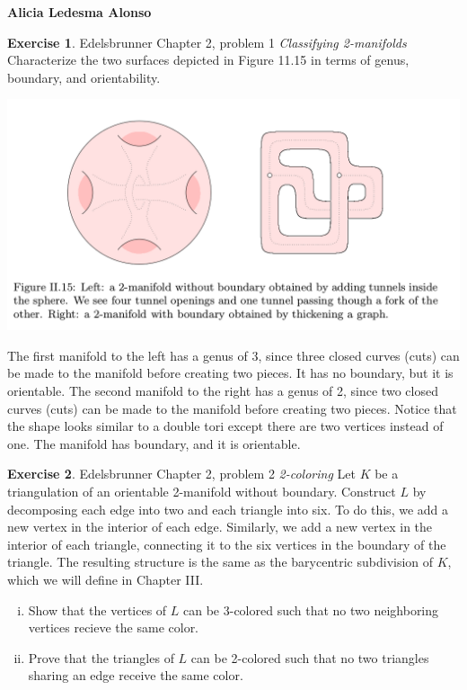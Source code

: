 \documentclass[12pt]{article}
\theoremstyle{definition}
\newtheorem{exercise}{Exercise}
\begin{document}
\textbf{Alicia Ledesma Alonso}

\begin{exercise} Edelsbrunner Chapter 2, problem 1 \textit{Classifying 2-manifolds}\newline
	Characterize the two surfaces depicted in Figure 11.15 in terms of genus, boundary, and orientability. \begin{center}\includegraphics[scale=0.4]{FigureII-15}\end{center} The first manifold to the left has a genus of 3, since three closed curves (cuts) can be made to the manifold before creating two pieces. It has no boundary, but it is orientable. The second manifold to the right has a genus of 2, since two closed curves (cuts) can be made to the manifold before creating two pieces. Notice that the shape looks similar to a double tori except there are two vertices instead of one. The manifold has boundary, and it is orientable. 
\end{exercise}

\begin{exercise} Edelsbrunner Chapter 2, problem 2 \textit{2-coloring}\newline
	Let $K$ be a triangulation of an orientable 2-manifold without boundary. Construct $L$ by decomposing each edge into two and each triangle into six. To do this, we add a new vertex in the interior of each edge. Similarly, we add a new vertex in the interior of each triangle, connecting it to the six vertices in the boundary of the triangle. The resulting structure is the same as the barycentric subdivision of $K$, which we will define in Chapter III.
	\begin{enumerate}[(i)]
		\item Show that the vertices of $L$ can be 3-colored such that no two neighboring vertices recieve the same color. 
		\item Prove that the triangles of $L$ can be 2-colored such that no two triangles sharing an edge receive the same color. 
	\end{enumerate}
\end{exercise}
\end{document}
